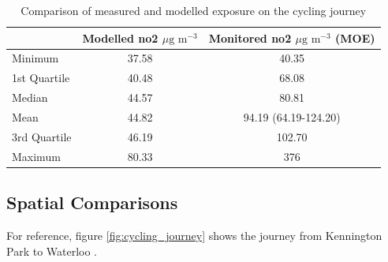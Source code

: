 \begin{table}[H]
\caption{Comparison of measured and modelled exposure on the cycling journey}
\centering
    \begin{tabular}{ | l | c | c |}
    \hline 
        & \bfseries{Modelled \gls{no2} $\mu \text{g m}^{-3}$} & \bfseries{Monitored \gls{no2} $\mu \text{g m}^{-3}$ (MOE)}                \\ \hline
     Minimum         & 37.58 & 40.35                \\ \hline
     1st Quartile    & 40.48 &  68.08               \\ \hline
     Median          & 44.57 & 80.81                \\ \hline
     Mean            & 44.82 & 94.19 (64.19-124.20) \\ \hline
     3rd Quartile    & 46.19 & 102.70               \\ \hline
     Maximum         & 80.33 & 376                  \\ \hline
    \end{tabular}
\label{tab:modelled_monitored_cycling_summary}
\end{table}

\subsection{Spatial Comparisons}
\label{subsec:spatialcomparisons}

For reference, figure \ref{fig:cycling_journey} shows the journey from Kennington Park to Waterloo .

